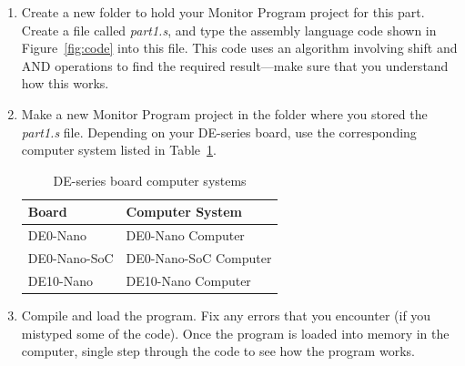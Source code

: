 \documentclass[epsfig,10pt,fullpage]{article}
\begin{document}
\begin{enumerate}
\item Create a new folder to hold your Monitor Program project for this part. Create a
file called {\it part1.s}, and type the assembly language code shown in 
Figure~\ref{fig:code} into this file.
This code uses an algorithm involving shift and AND operations to find the required 
result---make sure that you understand how this works.

\item
Make a new Monitor Program project in the folder where you stored the {\it part1.s}
file. Depending on your DE-series board, use the corresponding computer system 
listed in Table~\ref{tab:computer_systems}.

\begin{table}[H]
	\begin{center}
	\begin{tabular}{ l | l }
	\bf{Board} & \bf{Computer System} \\
	\hline
	\rule{0pt}{3ex}DE0-Nano & DE0-Nano Computer \\
	DE0-Nano-SoC & DE0-Nano-SoC Computer \\
	DE10-Nano & DE10-Nano Computer \\
	\end{tabular}
	\caption{DE-series board computer systems}
	\label{tab:computer_systems}
	\end{center}
\end{table}

\item
Compile and load the program. Fix any errors that you encounter (if you mistyped some of
the code). Once the program is loaded into memory in the computer, single step
through the code to see how the program works.
\end{enumerate}
\end{document}

